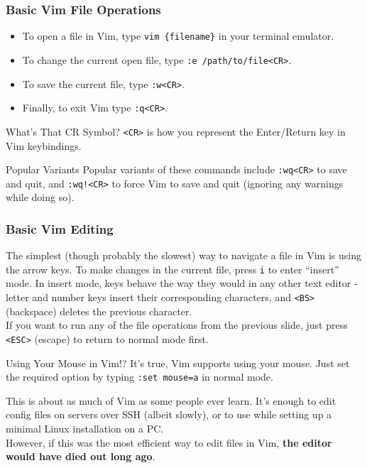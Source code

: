 \documentclass{beamer}
\begin{document}
\begin{frame}[fragile]
    \frametitle{Basic Vim File Operations}
    \small
    \begin{itemize}
	\item To open a file in Vim, type \verb+vim {filename}+ in your terminal emulator.
	\item To change the current open file, type \verb+:e /path/to/file<CR>+.
	\item To save the current file, type \verb+:w<CR>+.
	\item Finally, to exit Vim type \verb+:q<CR>+.
    \end{itemize}
    \begin{block}{What's That CR Symbol?}
	\verb+<CR>+ is how you represent the Enter/Return key in Vim keybindings.
    \end{block}
    \begin{block}{Popular Variants}
	Popular variants of these commands include \verb+:wq<CR>+ to save and quit, and \verb+:wq!<CR>+ to force Vim to save and quit (ignoring any warnings while doing so).
    \end{block}
\end{frame}

\begin{frame}[fragile]
    \frametitle{Basic Vim Editing}
    \small
    The simplest (though probably the slowest) way to navigate a file in Vim is using the arrow keys. To make changes in the current file, press \verb+i+ to enter \enquote{insert} mode. In insert mode, keys behave the way they would in any other text editor - letter and number keys insert their corresponding characters, and \verb+<BS>+ (backspace) deletes the previous character. \\
    \vspace{0.5cm}
    If you want to run any of the file operations from the previous slide, just press \verb+<ESC>+ (escape) to return to normal mode first.
    \begin{block}{Using Your Mouse in Vim!?}
	It's true, Vim supports using your mouse. Just set the required option by typing \verb+:set mouse=a+ in normal mode.
    \end{block}
\end{frame}

\begin{frame}
    \small This is about as much of Vim as some people ever learn. It's enough to edit config files on servers over SSH (albeit slowly), or to use while setting up a minimal Linux installation on a PC. \\
    \vspace{0.5cm}
    However, if this was the most efficient way to edit files in Vim, \textbf{the editor would have died out long ago}.
\end{frame}
\end{document}

